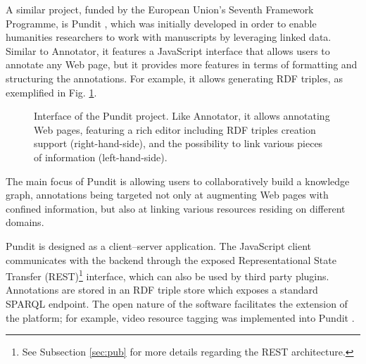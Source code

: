 A similar project, funded by the European Union's Seventh Framework Programme,
is Pundit \cite{ref:pundit}, which was initially developed in order to enable
humanities researchers to work with manuscripts by leveraging linked data.
Similar to Annotator, it features a JavaScript interface that allows users to
annotate any Web page, but it provides more features in terms of formatting and
structuring the annotations. For example, it allows generating RDF triples, as
exemplified in Fig. \ref{fig:pundit}.

\begin{figure}[!ht]
  \centering
  \caption[Interface of the Pundit project]
          {Interface of the Pundit project. Like Annotator, it allows
           annotating Web pages, featuring a rich editor
           including RDF triples creation support (right-hand-side), and
           the possibility to link various pieces of information
           (left-hand-side).}
  \label{fig:pundit}
\end{figure}

The main focus of Pundit is allowing users to collaboratively build a knowledge
graph, annotations being targeted not only at augmenting Web pages with
confined information, but also at linking various resources residing on
different domains.

Pundit is designed as a client--server application. The JavaScript client
communicates with the backend through the exposed Representational State
Transfer (REST)\footnote{See Subsection \ref{sec:pub} for more details regarding
the REST architecture.} interface, which can also be used by third party
plugins.  Annotations are stored in an RDF triple store which exposes a standard
SPARQL \cite{ref:sparql} endpoint. The open nature of the software facilitates
the extension of the platform; for example, video resource tagging was
implemented into Pundit \cite{ref:punditvideo}.

